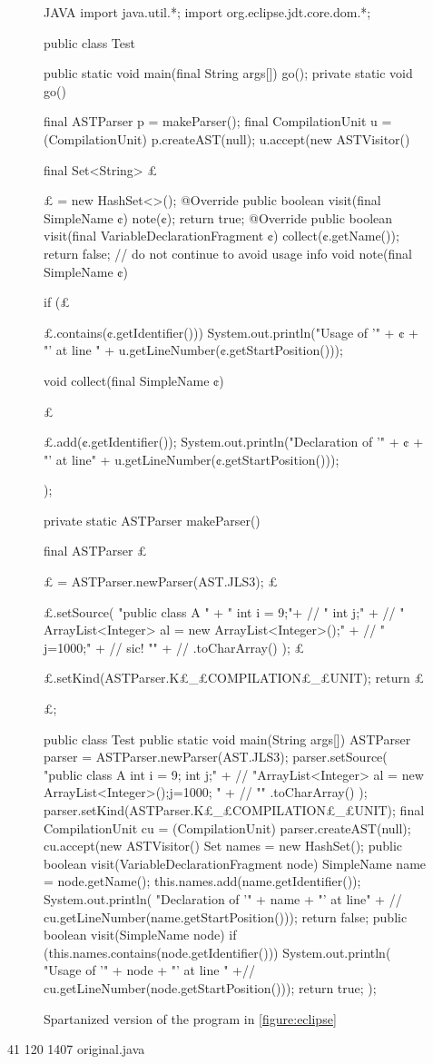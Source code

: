 \begin{figure}[H]
  \caption{Spartanized version of the program in \cref{figure:eclipse}}
  \label{figure:eclipse:spartan}
  \def\ignore#1{}
\begin{code}[listing style={numbered, language=Java},minipage,width=0.98\columnwidth]{JAVA}
import java.util.*;
import org.eclipse.jdt.core.dom.*;

public class Test {
  public static void main(final String args[]) {
    go();
  }
  private static void go() {
    final ASTParser p = makeParser();
    final CompilationUnit u = (CompilationUnit) p.createAST(null);
    u.accept(new ASTVisitor() {
      final Set<String> £\ignore$£$ = new HashSet<>();
      @Override public boolean visit(final SimpleName ¢) {
        note(¢);
        return true;
      }
      @Override public boolean visit(final VariableDeclarationFragment ¢) {
        collect(¢.getName());
        return false; // do not continue to avoid usage info
      }
      void note(final SimpleName ¢) {
        if (£\ignore$£$.contains(¢.getIdentifier()))
          System.out.println("Usage of '" + ¢ + "' at line " + u.getLineNumber(¢.getStartPosition()));
      }
      void collect(final SimpleName ¢) {
        £\ignore$£$.add(¢.getIdentifier());
        System.out.println("Declaration of '" + ¢ + "' at line" + u.getLineNumber(¢.getStartPosition()));
      }
    });
  }
  private static ASTParser makeParser() {
    final ASTParser £\ignore$£$ = ASTParser.newParser(AST.JLS3);
    £\ignore$£$.setSource(
      "public class A {\n" + 
      "  int i = 9;\n"+ //
      "  int j;\n" + //
      "  ArrayList<Integer> al = new ArrayList<Integer>();\n" + //
      "  j=1000;\n" + // sic!
      "}\n" + //
      .toCharArray()
    );
    £\ignore$£$.setKind(ASTParser.K£\_£COMPILATION£\_£UNIT);
    return £\ignore$£$;
  }
}
public class Test {
  public static void main(String args[]) {
    ASTParser parser = ASTParser.newParser(AST.JLS3);
    parser.setSource(
      "public class A { int i = 9;  \n int j;\n" + //
      "ArrayList<Integer> al = new ArrayList<Integer>();j=1000; }" + //
      ""
      .toCharArray()
    );
    parser.setKind(ASTParser.K£\_£COMPILATION£\_£UNIT);
    final CompilationUnit cu = (CompilationUnit) parser.createAST(null);
    cu.accept(new ASTVisitor() {
      Set names = new HashSet();
      public boolean visit(VariableDeclarationFragment node) {
        SimpleName name = node.getName();
        this.names.add(name.getIdentifier());
        System.out.println(
          "Declaration of '" + name + "' at line" + //
          cu.getLineNumber(name.getStartPosition()));
        return false; 
      }
      public boolean visit(SimpleName node) {
        if (this.names.contains(node.getIdentifier())) {
          System.out.println(
            "Usage of '" + node + "' at line " +//
            cu.getLineNumber(node.getStartPosition()));
        }
        return true;
      }
    });
  }
}
  \end{code}
\end{figure}
  41  120 1407 original.java





